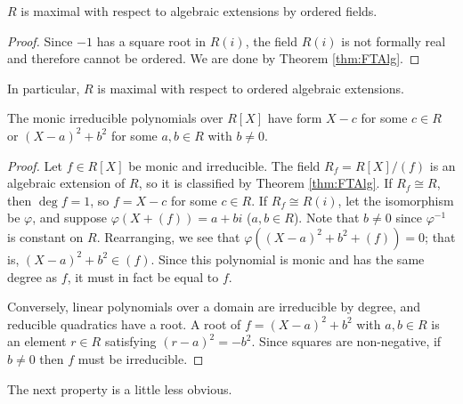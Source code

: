 \begin{lemma}
  \label{lem:RCF_max}
  $R$ is maximal with respect to algebraic extensions by ordered fields.
\end{lemma}
\begin{proof}
  Since $-1$ has a square root in $R(i)$, the field $R(i)$ is not formally real and therefore cannot be ordered. We are done by Theorem \ref{thm:FTAlg}.
\end{proof}

In particular, $R$ is maximal with respect to ordered algebraic extensions.

\begin{lemma}
  \label{lem:irreds_class}
  The monic irreducible polynomials over $R[X]$ have form $X-c$ for some $c\in R$ or $(X-a)^2+b^2$ for some $a,b\in R$ with $b\neq0$.
\end{lemma}
\begin{proof}
  Let $f\in R[X]$ be monic and irreducible. The field $R_f=R[X]/(f)$ is an algebraic extension of $R$, so it is classified by Theorem \ref{thm:FTAlg}. If $R_f\cong R$, then $\deg f=1$, so $f=X-c$ for some $c\in R$. If $R_f\cong R(i)$, let the isomorphism be $\varphi$, and suppose $\varphi(X+(f))=a+bi$ ($a,b\in R$). Note that $b\neq0$ since $\varphi^{-1}$ is constant on $R$. Rearranging, we see that $\varphi((X-a)^2+b^2+(f))=0$; that is, $(X-a)^2+b^2\in(f)$. Since this polynomial is monic and has the same degree as $f$, it must in fact be equal to $f$.

  Conversely, linear polynomials over a domain are irreducible by degree, and reducible quadratics have a root. A root of $f=(X-a)^2+b^2$ with $a,b\in R$ is an element $r\in R$ satisfying $(r-a)^2=-b^2$. Since squares are non-negative, if $b\neq0$ then $f$ must be irreducible.
\end{proof}

The next property is a little less obvious.

